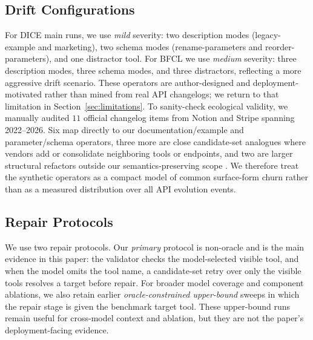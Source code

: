 \documentclass[runningheads]{llncs}
\begin{document}
\subsection{Drift Configurations}
For DICE main runs, we use \emph{mild} severity: two description modes
(legacy-example and marketing), two schema modes
(rename-parameters and reorder-parameters), and one distractor
tool. For BFCL we use \emph{medium} severity: three description modes, three schema
modes, and three distractors, reflecting a more aggressive drift scenario. These
operators are author-designed and deployment-motivated rather than mined from real
API changelogs; we return to that limitation in Section~\ref{sec:limitations}.
To sanity-check ecological validity, we manually audited $11$ official changelog
items from Notion and Stripe spanning 2022--2026. Six map directly to our
documentation/example and parameter/schema operators, three more are close
candidate-set analogues where vendors add or consolidate neighboring tools or
endpoints, and two are larger structural refactors outside our
semantics-preserving scope
\cite{notionchangelog2026,stripecheckout2022,stripedefaultvalue2025,stripeinvoicepreview2025,stripedelaydays2025}. We
therefore treat the synthetic operators as a compact model of common surface-form
churn rather than as a measured distribution over all API evolution events.

\subsection{Repair Protocols}
We use two repair protocols. Our \emph{primary} protocol is non-oracle and is the
main evidence in this paper: the validator checks the model-selected visible tool,
and when the model omits the tool name, a candidate-set retry over only the visible
tools resolves a target before repair. For broader model coverage and component
ablations, we also retain earlier \emph{oracle-constrained upper-bound} sweeps in
which the repair stage is given the benchmark target tool. These upper-bound runs
remain useful for cross-model context and ablation, but they are not the paper's
deployment-facing evidence.
\end{document}
